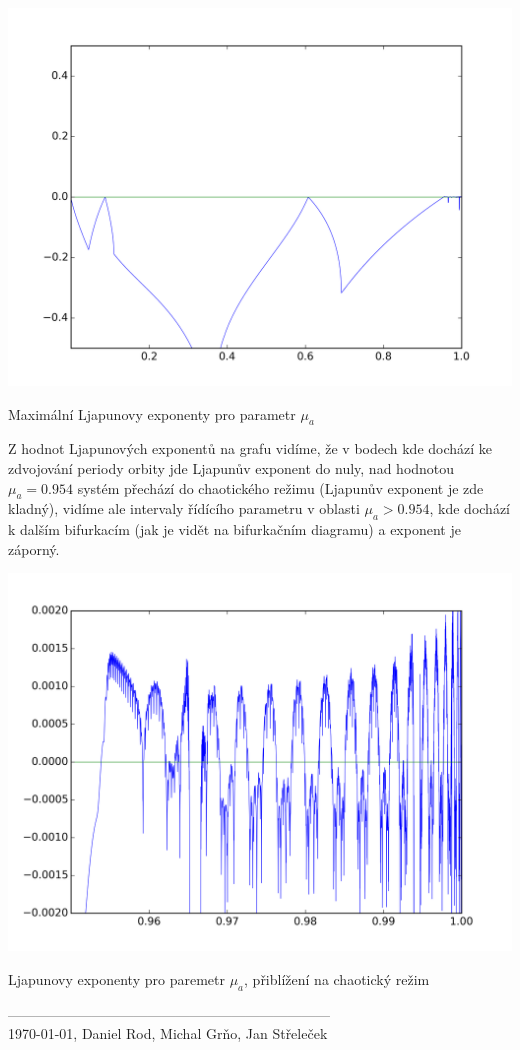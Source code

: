 \documentclass[a4paper, 12pt]{article}
\begin{document}
\begin{graph}[H]
	\centering
\includegraphics[width=\textwidth]{grafy/mua_f_wid.png}
\vspace{-10pt}
\caption{Maximální Ljapunovy exponenty pro parametr $\mu_a$}
\label{fig:lyapunov_mua}
\end{graph}

Z hodnot Ljapunových exponentů na grafu vidíme, že v bodech kde dochází ke zdvojování periody orbity jde Ljapunův exponent do nuly, nad hodnotou $\mu_a=0.954$ systém přechází do chaotického režimu (Ljapunův exponent je zde kladný), vidíme ale intervaly řídícího parametru v oblasti $\mu_a > 0.954$, kde dochází k dalším bifurkacím (jak je vidět na bifurkačním diagramu) a exponent je záporný.

\begin{graph}[H]
	\centering
\includegraphics[width=\textwidth]{grafy/mua.png}
\vspace{-10pt}
\caption{Ljapunovy exponenty pro paremetr $\mu_a$, přiblížení na chaotický režim}
\label{fig:lyapunov_mua_zoom}
\end{graph}

---------------------------------------------------------------------\\
\today, Daniel Rod, Michal Grňo, Jan Střeleček
\end{document}
